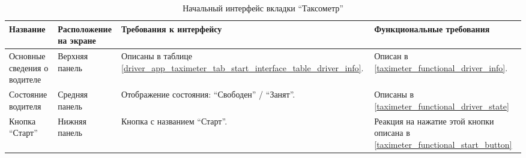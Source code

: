        \begin{table}[h]
          \begin{center}
          \caption {Начальный интерфейс вкладки “Таксометр”}
          \label{driver_app_taximeter_tab_start_interface_table}
          \setlength{\extrarowheight}{2mm}
            \begin{tabular}{|p{4cm}|p{3cm}|p{4cm}|p{4cm}|}
              \hline     \textbf{Название}&\textbf{Расположение на экране}&\textbf{Требования к интерфейсу}&\textbf{Функциональные требования} \\ [2mm]

              \hline   Основные сведения о водителе & Верхняя панель & Описаны в таблице \ref{driver_app_taximeter_tab_start_interface_table_driver_info}. & Описан в \ref{taximeter_functional_driver_info}.\\ [2mm]

              \hline   Состояние водителя & Средняя панель & Отображение состояния: “Свободен” / “Занят”. & Описаны в \ref{taximeter_functional_driver_state} \\ [2mm]

              \hline   Кнопка “Старт” & Нижняя панель & Кнопка с названием “Старт”. & Реакция на нажатие этой кнопки описана в \ref{taximeter_functional_start_button}\\ [2mm]

              \hline
            \end{tabular}
          \end{center}
        \end{table}


